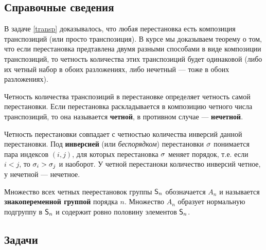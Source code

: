 \subsection*{Справочные сведения}

В задаче \ref{transp} доказывалось, что любая перестановка есть композиция транспозиций (или просто транспозиция). В курсе мы доказываем теорему о том, что если перестановка предтавлена двумя разными способами в виде композиции транспозиций, то четность количества этих транспозиций будет одинаковой (либо их четный набор в обоих разложениях, либо нечетный --- тоже в обоих разложениях).

Четность количества транспозиций в перестановке определяет четность самой перестановки. Если перестановка раскладывается в композицию четного числа транспозиций, то она называется \textbf{четной}, в противном случае --- \textbf{нечетной}.

Четность перестановки совпадает с четностью количества инверсий данной перестановки. Под \textbf{инверсией} (или \textit{беспорядком}) перестановки $\sigma$ понимается пара индексов $(i,j)$, для которых перестановка $\sigma$ меняет порядок, т.е. если $i<j$, то $\sigma_i>\sigma_j$ и наоборот. У четной перестаноки количество инверсий четное, у нечетной --- нечетное.

Множество всех четных пеерестановок группы ${\mathsf{S}}_n$ обозначается $A_n$ и называется \textbf{знакопеременной группой} порядка $n$. Множество $A_n$ образует нормальную подгруппу в ${\mathsf{S}}_n$ и содержит ровно половину элементов ${\mathsf{S}}_n$.

\subsection*{Задачи}

